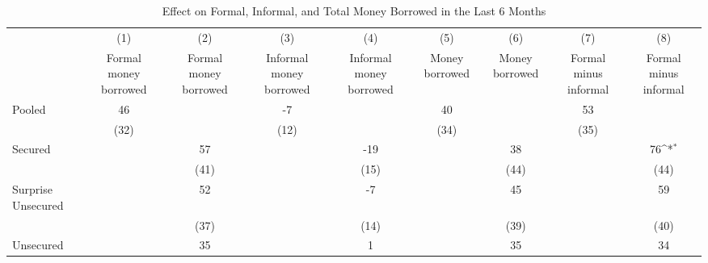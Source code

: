 \begin{table}[htbp]\centering
\def\sym#1{\ifmmode^{#1}\else\(^{#1}\)\fi}
\caption{Effect on Formal, Informal, and Total Money Borrowed in the Last 6 Months\label{endline\_moneyborrowed}}
\begin{tabular}{l*{8}{c}}
\toprule
                    &\multicolumn{1}{c}{(1)}&\multicolumn{1}{c}{(2)}&\multicolumn{1}{c}{(3)}&\multicolumn{1}{c}{(4)}&\multicolumn{1}{c}{(5)}&\multicolumn{1}{c}{(6)}&\multicolumn{1}{c}{(7)}&\multicolumn{1}{c}{(8)}\\
                    &\multicolumn{1}{c}{Formal money borrowed}&\multicolumn{1}{c}{Formal money borrowed}&\multicolumn{1}{c}{Informal money borrowed}&\multicolumn{1}{c}{Informal money borrowed}&\multicolumn{1}{c}{Money borrowed}&\multicolumn{1}{c}{Money borrowed}&\multicolumn{1}{c}{Formal minus informal}&\multicolumn{1}{c}{Formal minus informal}\\
\midrule
Pooled              &          46         &                     &          -7         &                     &          40         &                     &          53         &                     \\
                    &        (32)         &                     &        (12)         &                     &        (34)         &                     &        (35)         &                     \\\addlinespace
Secured             &                     &          57         &                     &         -19         &                     &          38         &                     &          76\sym{*}  \\
                    &                     &        (41)         &                     &        (15)         &                     &        (44)         &                     &        (44)         \\\addlinespace
Surprise Unsecured  &                     &          52         &                     &          -7         &                     &          45         &                     &          59         \\
                    &                     &        (37)         &                     &        (14)         &                     &        (39)         &                     &        (40)         \\\addlinespace
Unsecured           &                     &          35         &                     &           1         &                     &          35         &                     &          34         \\

\end{tabular}
\end{table}
